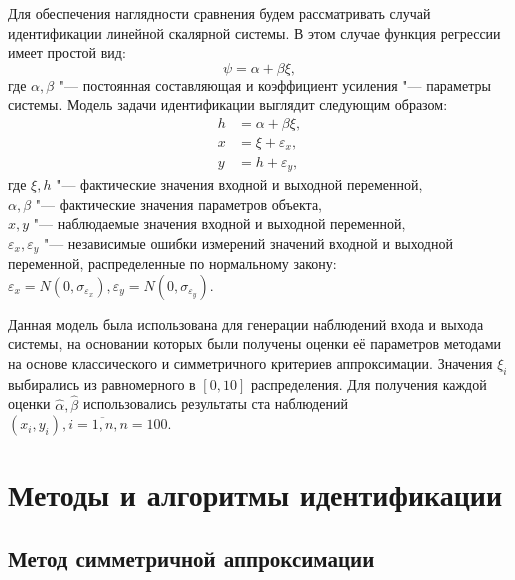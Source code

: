 Для обеспечения наглядности сравнения будем рассматривать случай
идентификации линейной скалярной системы.
В этом случае функция регрессии имеет простой вид:
\begin{equation}
  \psi = \alpha + \beta \xi,
  \label{eq:linear_fun_scalar}
\end{equation}
где \( \alpha, \beta \) "--- постоянная составляющая и коэффициент усиления "---
параметры системы. Модель задачи идентификации выглядит следующим образом:
\begin{equation}
  \label{eq:linear_model_scalar}
  \begin{aligned}
  h &= \alpha + \beta \xi, \\
  x &= \xi + \varepsilon_x, \\
  y &= h + \varepsilon_y,
  \end{aligned}
\end{equation}
где \( \xi, h \) "--- фактические значения входной и выходной переменной, \\
\hspace*{6mm} \( \alpha, \beta \) "--- фактические значения параметров объекта, \\
\hspace*{6mm} \( x, y \) "--- наблюдаемые значения входной и выходной переменной, \\
\hspace*{5mm} \( \varepsilon_x, \varepsilon_y \) "--- независимые ошибки измерений значений
входной и выходной переменной, распределенные по нормальному закону:
\(
\varepsilon_x = N(0, \sigma_{\varepsilon_x}),
\varepsilon_y = N(0, \sigma_{\varepsilon_y})
\).

Данная модель была использована для генерации наблюдений входа и выхода системы,
на основании которых были получены оценки её параметров методами на основе
классического и симметричного критериев аппроксимации.
Значения \( \xi_i \) выбирались из равномерного в \( [0, 10] \) распределения.
Для получения каждой оценки \( \hat{\alpha}, \hat{\beta} \) использовались результаты
ста наблюдений \( ( x_i, y_i ), i = \overline{1, n}, n = 100 \).

\section{Методы и алгоритмы идентификации}

\subsection{Метод симметричной аппроксимации}\label{ssec:linear_method_symmetric}

